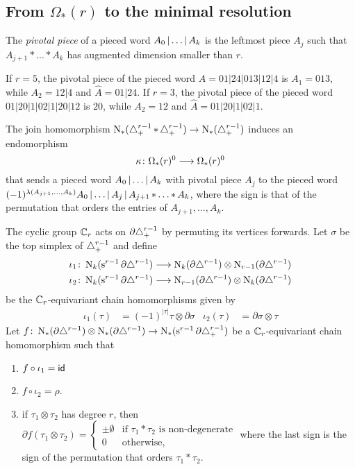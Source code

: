 
\subsection{From $\Omega_*(r)$ to the minimal resolution}\label{ss:mapf} The \emph{pivotal piece} of a pieced word $A_0\operatorname{|} \ldots\operatorname{|} A_k$ is the leftmost piece $A_j$ such that $A_{j+1}*\ldots*A_k$ has augmented dimension smaller than $r$.

\begin{example}
	If $r=5$, the pivotal piece of the pieced word $A=01|24|013|12|4$ is $A_1 = 013$, while $A_2 = 12|4$ and $\hat{A} = 01|24$. If $r=3$, the pivotal piece of the pieced word $01|20|1|02|1|20|12$ is $20$, while $A_2 = 12$ and $\hat{A} = 01|20|1|02|1$. 
\end{example}


The join homomorphism $\operatorname{N}_*(\triangle_{+}^{r-1}\operatorname{\ast} \triangle_{+}^{r-1})\to \operatorname{N}_*(\triangle_{+}^{r-1})$ induces an endomorphism
\[
\kappa\colon \Omega_*(r)^0\longrightarrow \Omega_*(r)^0 
\]
that sends a pieced word $A_0\operatorname{|} \ldots\operatorname{|} A_k$ with pivotal piece $A_j$ to the pieced word $(-1)^{\lambda(A_{j+1},\ldots,A_k)}A_0\operatorname{|} \ldots\operatorname{|} A_j\operatorname{|} A_{j+1}\operatorname{\ast}\ldots\operatorname{\ast} A_k$, where the sign is that of the permutation that orders the entries of $A_{j+1},\ldots,A_k$.

The cyclic group $\mathbb{C}_r$ acts on $\partial \triangle_{+}^{r-1}$ by permuting its vertices forwards. Let $\sigma$ be the top simplex of $\triangle_{+}^{r-1}$ and define
\begin{align*}
	\iota_1\colon \operatorname{N}_k(\operatorname{s}^{r-1}\partial \triangle^{r-1})&\longrightarrow \operatorname{N}_{k}(\partial\triangle^{r-1})\otimes \operatorname{N}_{r-1}(\partial\triangle^{r-1})\\
	\iota_2\colon \operatorname{N}_k(\operatorname{s}^{r-1}\partial \triangle^{r-1})&\longrightarrow \operatorname{N}_{r-1}(\partial\triangle^{r-1})\otimes \operatorname{N}_{k}(\partial\triangle^{r-1})
\end{align*}
be the $\mathbb{C}_r$-equivariant chain homomorphisms given by
\begin{align*}
	\iota_1(\tau) &= (-1)^{|\tau|}\tau\otimes \partial \sigma &
	\iota_2(\tau) &= \partial \sigma\otimes \tau
\end{align*}
Let $f\colon \operatorname{N}_*(\partial\triangle^{r-1})\otimes\operatorname{N}_*(\partial\triangle^{r-1})\to \operatorname{N}_*(\operatorname{s}^{r-1}\partial\triangle_{+}^{r-1})$ be a $\mathbb{C}_r$-equivariant chain homomorphism such that
\renewcommand{\theenumi}{\roman{enumi}}
\begin{enumerate}
	\item\label{cond:1} $f\circ \iota_1 = \mathsf{id}$
	\item\label{cond:2} $f\circ \iota_2 = \rho$.
	\item\label{cond:3} if $\tau_1\otimes\tau_2$ has degree $r$, then $ \partial f(\tau_1\otimes\tau_2) =
	\begin{cases}
	\pm\emptyset & \text{if $\tau_1* \tau_2$ is non-degenerate} \\
	0 & \text{otherwise},
	\end{cases}$
 where the last sign is the sign of the permutation that orders $\tau_1*\tau_2$.
\end{enumerate}

